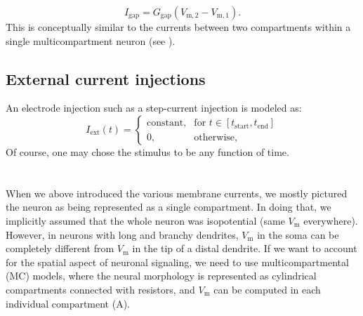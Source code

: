 \begin{equation}
I_\text{gap}=G_\text{gap} (V_\mathrm{m,2}-V_\mathrm{m,1}).
\label{eq:Neuron:gapjunction}
\end{equation}
This is conceptually similar to the currents between two compartments within a single multicompartment neuron (see ).


\subsection{External current injections}
An electrode injection such as a step-current injection is modeled as:
\begin{equation}
I_\text{ext}(t)= 
\begin{cases}
    \text{constant}, & \text{for } t \in [t_\mathrm{start}, t_\mathrm{end}] \\
    0,              & \text{otherwise},
\end{cases}
\label{eq:Neuron:injected}
\end{equation}
Of course, one may chose the stimulus to be any function of time.



\section{}
\label{sec:Neuron:morphology}
When we above introduced the various membrane currents, we mostly pictured the neuron as being represented as a single compartment. In doing that, we implicitly assumed that the whole neuron was isopotential (same $V_\mathrm{m}$ everywhere). However, in neurons with long and branchy dendrites, $V_\mathrm{m}$ in the soma can be completely different from $V_\mathrm{m}$ in the tip of a distal dendrite. If we want to account for the spatial aspect of neuronal signaling, we need to use multicompartmental (MC) models, where the neural morphology is represented as cylindrical compartments connected with resistors, and $V_\mathrm{m}$ can be computed in each individual compartment (A). 

